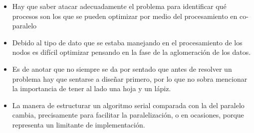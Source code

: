 \documentclass[fleqn,10pt]{SelfArx} %
\begin{document}

\begin{itemize}
	\item Hay que saber atacar adecuadamente el problema para identificar qué procesos son los que se pueden optimizar por medio del procesamiento en co-paralelo
	\item Debido al tipo de dato que se estaba manejando en el procesamiento de los nodos es difícil optimizar pensando en la fase de la aglomeración de los datos.
	\item Es de anotar que no siempre se da por sentado que antes de resolver un problema hay que sentarse a diseñar primero, por lo que no sobra mencionar la importancia de tener al lado una hoja y un lápiz.
	\item La manera de estructurar un algoritmo serial comparada con la del paralelo cambia, precisamente para facilitar la paralelización, o en ocasiones, porque representa un limitante de implementación.
\end{itemize}

\end{document}
